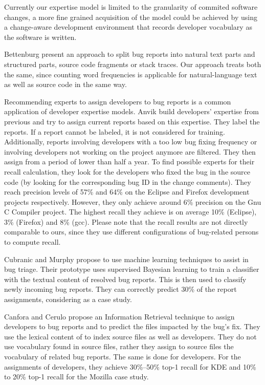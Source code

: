 Currently our expertise model is limited to the granularity of commited software changes, a more fine grained acquisition of the model could be achieved by using a change-aware development environment \cite{Omor08a,Robb08a} that records developer vocabulary as the software is written.  

Bettenburg \etal \cite{Bett08c} present an approach to split bug reports into natural text parts and structured parts, \ie source code fragments or stack traces. Our approach treats both the same, since counting word frequencies is applicable for natural-language text as well as source code in the same way.

Recommending experts to assign developers to bug reports is a common application of developer expertise models.
Anvik \etal \cite{Anvi06a} build developers' expertise from previous \BRs and try to assign current reports based on this expertise. They label the reports. If a report cannot be labeled, it is not considered for training. Additionally, reports involving developers with a too low bug fixing frequency or involving developers not working on the project anymore are filtered. They then assign \BRs from a period of lower than half a year. To find possible experts for their recall calculation, they look for the developers who fixed the bug in the source code (by looking for the corresponding bug ID in the change comments). They reach precision levels of 57\% and 64\% on the Eclipse and Firefox development projects respectively. However, they only achieve around 6\% precision on the Gnu C Compiler project. The highest recall they achieve is on average 10\% (Eclipse), 3\% (Firefox) and 8\% (gcc). Please note that the recall results are not directly comparable to ours, since they use different configurations of bug-related persons to compute recall.

Cubranic and Murphy \cite{Cubr04b} propose to use machine learning techniques to assist in bug triage. Their prototype uses supervised Bayesian learning to train a classifier with the textual content of resolved bug reports. This is then used to classify newly incoming bug reports. They can correctly predict 30\% of the report assignments, considering \EC as a case study.

Canfora and Cerulo \cite{Canf05a} propose an Information Retrieval technique to assign developers to bug reports and to predict the files impacted by the bug's fix. They use the lexical content of \BRs to index source files as well as developers. They do not use vocabulary found in source files, rather they assign to source files the vocabulary of related bug reports. The same is done for developers. For the assignments of developers, they achieve 30\%--50\% top-1 recall for KDE and 10\% to 20\% top-1 recall for the Mozilla case study.

